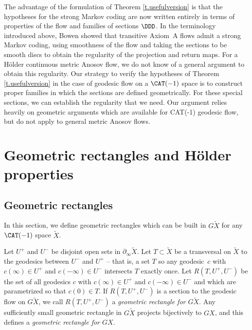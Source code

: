 The advantage of the formulation of Theorem \ref{t.usefulversion} is that the hypotheses for the strong Markov coding are now written entirely in terms of properties of the flow and families of sections $\DDD$. In the terminology introduced above, Bowen showed that transitive Axiom~A flows admit a strong Markov coding, using smoothness of the flow and taking the sections to be smooth discs to obtain the regularity of the projection and return maps. For a Hölder continuous metric Anosov flow, we do not know of a general argument to obtain this regularity. Our strategy to verify the hypotheses of Theorem \ref{t.usefulversion} in the case of geodesic flow on a $\CAT(-1)$ space is to construct proper families in which the sections are defined geometrically. For these special sections, we can establish the regularity that we need. Our argument relies heavily on geometric arguments which are available for CAT(-1) geodesic flow, but do not apply to general metric Anosov flows.

\section{Geometric rectangles and Hölder properties}\label{sec:good rectangles}

\subsection{Geometric rectangles} \label{subsec:geom rect}

In this section, we define geometric rectangles which can be built in $G\tilde X$ for any $\CAT(-1)$ space $\tilde X$.

\begin{defn}\label{def:geom rectangle}
Let $U^+$ and $U^-$ be disjoint open sets in $\partial_\infty \tilde X$. Let $T \subset \tilde X$ be a transversal on $\tilde X$ to the geodesics between $U^-$ and $U^+$ -- that is, a set $T$ so any geodesic~$c$ with $c(\infty)\in U^+$ and $c(-\infty) \in U^-$ intersects $T$ exactly once. Let $R(T, U^+, U^-)$ be the set of all geodesics $c$ with $c(\infty)\in U^+$ and $c(-\infty) \in U^-$ and which are parametrized so that $c(0)\in T$. If $R(T,U^+,U^-)$ is a section to the geodesic flow on $G \tilde X$, we call $R(T,U^+,U^-)$ a \emph{geometric rectangle for $G\tilde X$}. Any sufficiently small geometric rectangle in $G\tilde X$ projects bijectively to $GX$, and this defines a \emph{geometric rectangle for $GX$}.
\end{defn}

